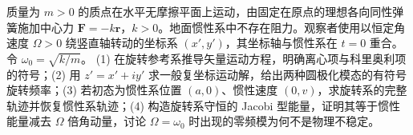 质量为 \(m>0\) 的质点在水平无摩擦平面上运动，由固定在原点的理想各向同性弹簧施加中心力 \(\boldsymbol F=-k\boldsymbol r\)，\(k>0\)。地面惯性系中不存在阻力。观察者使用以恒定角速度 \(\Omega>0\) 绕竖直轴转动的坐标系 \((x',y')\)，其坐标轴与惯性系在 \(t=0\) 重合。令 \(\omega_0=\sqrt{k/m}\)。
(1) 在旋转参考系推导矢量运动方程，明确离心项与科里奥利项的符号；(2) 用 \(z'=x'+iy'\) 求一般复坐标运动解，给出两种圆极化模态的有符号旋转频率；(3) 若初态为惯性系位置 \((a,0)\)、惯性速度 \((0,v)\)，求旋转系的完整轨迹并恢复惯性系轨迹；(4) 构造旋转系守恒的 Jacobi 型能量，证明其等于惯性能量减去 \(\Omega\) 倍角动量，讨论 \(\Omega=\omega_0\) 时出现的零频模为何不是物理不稳定。
